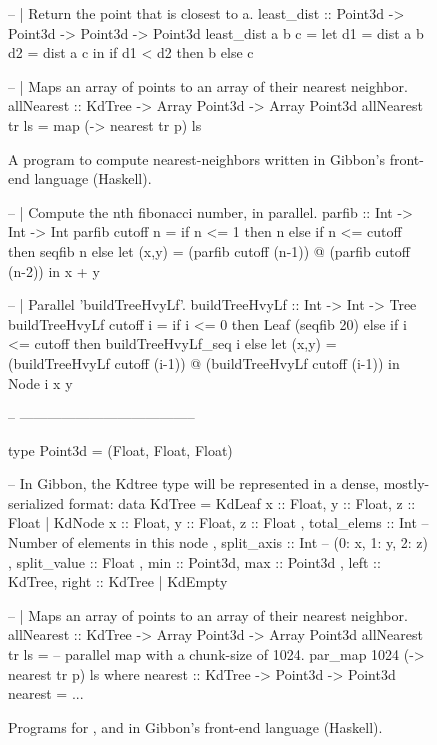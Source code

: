 {\begin{figure}[h!]
\begin{code}
-- | Return the point that is closest to a.
least_dist :: Point3d -> Point3d -> Point3d -> Point3d
least_dist a b c =
  let d1 = dist a b
      d2 = dist a c
  in if d1 < d2 then b else c

-- | Maps an array of points to an array of their nearest neighbor.
allNearest :: KdTree -> Array Point3d -> Array Point3d
allNearest tr ls = map (\p -> nearest tr p) ls
\end{code}
\caption{
A program to compute nearest-neighbors written in Gibbon's front-end language (Haskell).
}
\label{fig:gibbon-nearest-neighbors}
\end{figure}
}
\fi

\begin{figure}[h!]
\begin{code}
-- | Compute the nth fibonacci number, in parallel.
parfib :: Int -> Int -> Int
parfib cutoff n = if n <= 1
                  then n
                  else if n <= cutoff
                       then seqfib n
                       else let (x,y) = (parfib cutoff (n-1)) @\partup@
                                        (parfib cutoff (n-2))
                            in x + y    

-- | Parallel 'buildTreeHvyLf'.
buildTreeHvyLf :: Int -> Int -> Tree
buildTreeHvyLf cutoff i = if i <= 0
                          then Leaf (seqfib 20)
                          else if i <= cutoff
                               then buildTreeHvyLf_seq i
                               else let (x,y) = (buildTreeHvyLf cutoff (i-1)) @\partup@
                                                (buildTreeHvyLf cutoff (i-1))
                                    in Node i x y
             
-- --------------------------------------

type Point3d = (Float, Float, Float)

-- In Gibbon, the Kdtree type will be represented in a dense, mostly-serialized format:
data KdTree = KdLeaf { x :: Float, y :: Float, z :: Float }
            | KdNode { x :: Float, y :: Float, z :: Float
                     , total_elems   :: Int   -- Number of elements in this node
                     , split_axis    :: Int   -- (0: x, 1: y, 2: z)
                     , split_value   :: Float
                     , min :: Point3d, max :: Point3d
                     , left :: KdTree, right :: KdTree
                     }
            | KdEmpty

-- | Maps an array of points to an array of their nearest neighbor.
allNearest :: KdTree -> Array Point3d -> Array Point3d
allNearest tr ls =
    -- parallel map with a chunk-size of 1024.
    par_map 1024 (\p -> nearest tr p) ls
  where
    nearest :: KdTree -> Point3d -> Point3d
    nearest = ...

\end{code}
\caption{
Programs for , \buildfib{} and
 in Gibbon's front-end language (Haskell).
}
\label{fig:gibbon-examples}
\end{figure}



